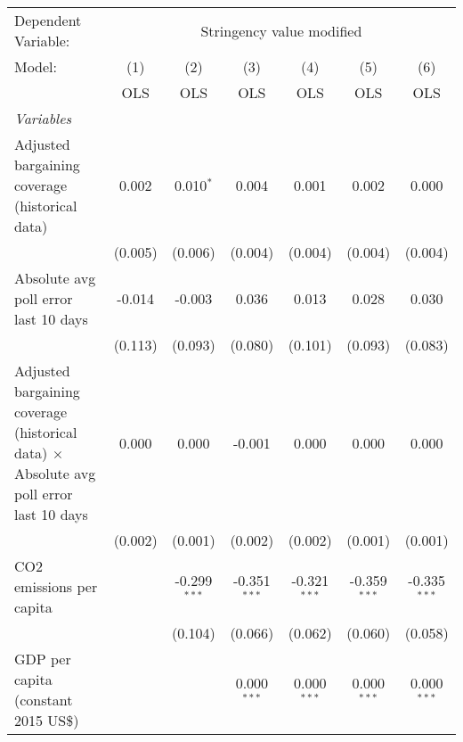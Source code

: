 
\begingroup
\centering
\begin{tabular}{lcccccc}
   \toprule
   Dependent Variable: & \multicolumn{6}{c}{Stringency value modified}\\
   Model:                                                                                        & (1)     & (2)            & (3)            & (4)            & (5)            & (6)\\  
                                                                                                 &  OLS    & OLS            & OLS            & OLS            & OLS            & OLS\\  
   \midrule
   \emph{Variables}\\
   Adjusted bargaining coverage (historical data)                                                & 0.002   & 0.010$^{*}$    & 0.004          & 0.001          & 0.002          & 0.000\\   
                                                                                                 & (0.005) & (0.006)        & (0.004)        & (0.004)        & (0.004)        & (0.004)\\   
   Absolute avg poll error last 10 days                                                          & -0.014  & -0.003         & 0.036          & 0.013          & 0.028          & 0.030\\   
                                                                                                 & (0.113) & (0.093)        & (0.080)        & (0.101)        & (0.093)        & (0.083)\\   
   Adjusted bargaining coverage (historical data) $\times$ Absolute avg poll error last 10 days  & 0.000   & 0.000          & -0.001         & 0.000          & 0.000          & 0.000\\   
                                                                                                 & (0.002) & (0.001)        & (0.002)        & (0.002)        & (0.001)        & (0.001)\\   
   CO2 emissions per capita                                                                      &         & -0.299$^{***}$ & -0.351$^{***}$ & -0.321$^{***}$ & -0.359$^{***}$ & -0.335$^{***}$\\   
                                                                                                 &         & (0.104)        & (0.066)        & (0.062)        & (0.060)        & (0.058)\\   
   GDP per capita (constant 2015 US\$)                                                           &         &                & 0.000$^{***}$  & 0.000$^{***}$  & 0.000$^{***}$  & 0.000$^{***}$\\   

\end{tabular}
